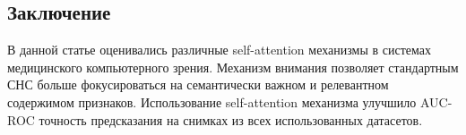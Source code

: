 \subsection*{Заключение}
В данной статье оценивались различные self-attention механизмы в 
системах медицинского компьютерного зрения. Механизм внимания позволяет 
стандартным СНС больше фокусироваться на семантически важном и релевантном 
содержимом признаков. Использование self-attention механизма улучшило AUC-ROC  
точность предсказания на снимках из всех использованных датасетов. 
